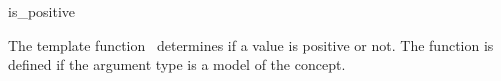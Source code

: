 \begin{ccRefFunction}{is_positive}

\ccDefinition

The template function \ccRefName\ determines if a value is positive or not.
The function is defined if the argument type 
is a model of the  concept. 



\ccSeeAlso
{} \\
\\

\end{ccRefFunction}
